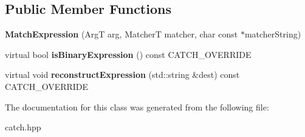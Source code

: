 \subsection*{Public Member Functions}
\begin{DoxyCompactItemize}
\item 
\mbox{\label{classCatch_1_1MatchExpression_a506f25bad7970cb35f9dbe54763a8ca5}} 
{\bfseries Match\+Expression} (ArgT arg, MatcherT matcher, char const $\ast$matcher\+String)
\item 
\mbox{\label{classCatch_1_1MatchExpression_ac4edf6e9a6e5762a487db1486d0d1f45}} 
virtual bool {\bfseries is\+Binary\+Expression} () const C\+A\+T\+C\+H\+\_\+\+O\+V\+E\+R\+R\+I\+DE
\item 
\mbox{\label{classCatch_1_1MatchExpression_a4410a93bc5b8241eb2502f400fce7ec4}} 
virtual void {\bfseries reconstruct\+Expression} (std\+::string \&dest) const C\+A\+T\+C\+H\+\_\+\+O\+V\+E\+R\+R\+I\+DE
\end{DoxyCompactItemize}


The documentation for this class was generated from the following file\+:\begin{DoxyCompactItemize}
\item 
catch.\+hpp\end{DoxyCompactItemize}
